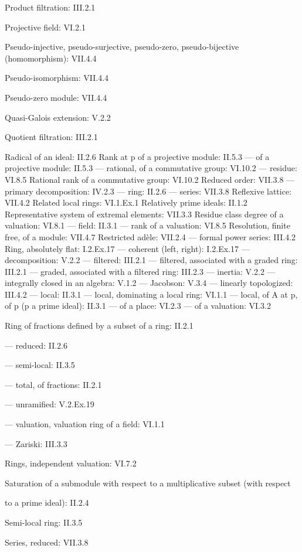 Product filtration: III.2.1

Projective field: VI.2.1

Pseudo-injective, pseudo-surjective, pseudo-zero, pseudo-bijective (homomorphism): VII.4.4

Pseudo-isomorphism: VII.4.4

Pseudo-zero module: VII.4.4

Quasi-Galois extension: V.2.2

Quotient filtration: III.2.1

Radical of an ideal: II.2.6 Rank at p of a projective module: II.5.3 --- of a projective module: II.5.3 --- rational, of a commutative group: VI.10.2 --- residue: VI.8.5 Rational rank of a commutative group: VI.10.2 Reduced order: VII.3.8 --- primary decomposition: IV.2.3 --- ring: II.2.6 --- series: VII.3.8 Reflexive lattice: VII.4.2 Related local rings: VI.1.Ex.1 Relatively prime ideals: II.1.2 Representative system of extremal elements: VII.3.3 Residue class degree of a valuation: VI.8.1 --- field: II.3.1 --- rank of a valuation: VI.8.5 Resolution, finite free, of a module: VII.4.7 Restricted adèle: VII.2.4 --- formal power series: III.4.2 Ring, absolutely flat: I.2.Ex.17 --- coherent (left, right): I.2.Ex.17 --- decomposition: V.2.2 --- filtered: III.2.1 --- filtered, associated with a graded ring: III.2.1 --- graded, associated with a filtered ring: III.2.3 --- inertia: V.2.2 --- integrally closed in an algebra: V.1.2 --- Jacobson: V.3.4 --- linearly topologized: III.4.2 --- local: II.3.1 --- local, dominating a local ring: VI.1.1 --- local, of A at p, of p (p a prime ideal): II.3.1 --- of a place: VI.2.3 --- of a valuation: VI.3.2

Ring of fractions defined by a subset of a ring: II.2.1

--- reduced: II.2.6

--- semi-local: II.3.5

--- total, of fractions: II.2.1

--- unramified: V.2.Ex.19

--- valuation, valuation ring of a field: VI.1.1

--- Zariski: III.3.3

Rings, independent valuation: VI.7.2

Saturation of a submodule with respect to a multiplicative subset (with respect

to a prime ideal): II.2.4

Semi-local ring: II.3.5

Series, reduced: VII.3.8

